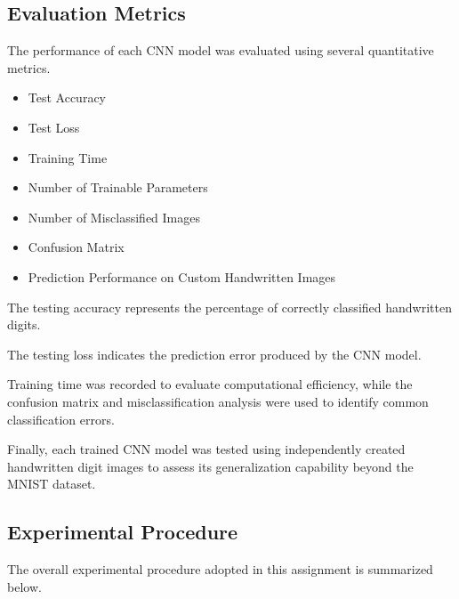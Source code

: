 \subsection{Evaluation Metrics}

The performance of each CNN model was evaluated using several quantitative metrics.

\begin{itemize}

\item Test Accuracy
\item Test Loss
\item Training Time
\item Number of Trainable Parameters
\item Number of Misclassified Images
\item Confusion Matrix
\item Prediction Performance on Custom Handwritten Images

\end{itemize}

The testing accuracy represents the percentage of correctly classified handwritten digits.

The testing loss indicates the prediction error produced by the CNN model.

Training time was recorded to evaluate computational efficiency, while the confusion matrix and misclassification analysis were used to identify common classification errors.

Finally, each trained CNN model was tested using independently created handwritten digit images to assess its generalization capability beyond the MNIST dataset.

\subsection{Experimental Procedure}

The overall experimental procedure adopted in this assignment is summarized below.

